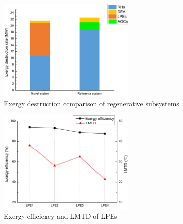 \documentclass[preprint,12pt]{elsarticle}
\begin{document}
\begin{figure}[htbp]
\centering
\includegraphics[width=0.6\textwidth]{fig/regenerative_subsys_compare.png}
\caption{Exergy destruction comparison of regenerative subsystems} 
\label{fig:regenerative_subsys_compare}
\end{figure}



\begin{figure}[htbp]
\centering
\includegraphics[width=0.6\textwidth]{fig/LPE_exergy_LMTD.png}
\caption{Exergy efficiency and LMTD of LPEs} 
\label{fig:LPE_exergy_LMDT}
\end{figure}
\end{document}
